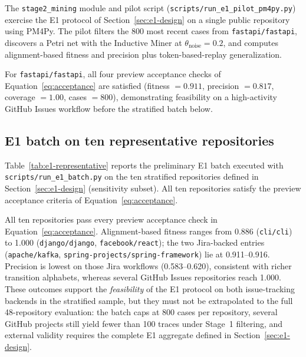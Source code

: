 The \texttt{stage2\_mining} module and pilot script
(\texttt{scripts/run\_e1\_pilot\_pm4py.py}) exercise the E1 protocol of
Section~\ref{sec:e1-design} on a single public repository using PM4Py.
The pilot filters the 800 most recent cases from \texttt{fastapi/fastapi},
discovers a Petri net with the Inductive Miner at
$\theta_{\text{noise}} = 0.2$, and computes alignment-based fitness and
precision plus token-based-replay generalization.



For \texttt{fastapi/fastapi}, all four preview acceptance checks of
Equation~\eqref{eq:acceptance} are satisfied (fitness $= 0.911$,
precision $= 0.817$, coverage $= 1.00$, cases $= 800$), demonstrating
feasibility on a high-activity GitHub Issues workflow before the stratified
batch below.

\subsection{E1 batch on ten representative repositories}
\label{sec:impl-e1-batch}

Table~\ref{tab:e1-representative} reports the preliminary E1 batch executed with
\texttt{scripts/run\_e1\_batch.py} on the ten stratified repositories defined in
Section~\ref{sec:e1-design} (sensitivity subset). All ten repositories satisfy
the preview acceptance criteria of Equation~\eqref{eq:acceptance}.



All ten repositories pass every preview acceptance check in
Equation~\eqref{eq:acceptance}. Alignment-based fitness ranges from
0.886 (\texttt{cli/cli}) to 1.000 (\texttt{django/django},
\texttt{facebook/react}); the two Jira-backed entries
(\texttt{apache/kafka}, \texttt{spring-projects/spring-framework}) lie at
0.911--0.916. Precision is lowest on those Jira workflows (0.583--0.620),
consistent with richer transition alphabets, whereas several GitHub Issues
repositories reach 1.000. These outcomes support the \emph{feasibility} of
the E1 protocol on both issue-tracking backends in the stratified sample,
but they must not be extrapolated to the full 48-repository evaluation: the
batch caps at 800 cases per repository, several GitHub projects still yield
fewer than 100 traces under Stage~1 filtering, and external validity requires
the complete E1 aggregate defined in Section~\ref{sec:e1-design}.


